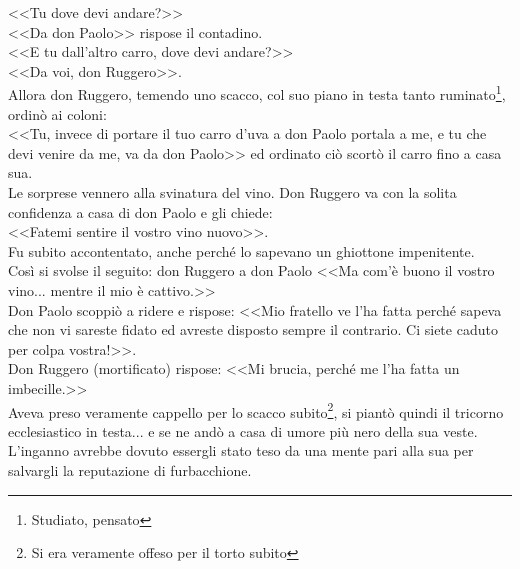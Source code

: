 \indent <<Tu dove devi andare?>>\\
\indent <<Da don Paolo>> rispose il contadino. \\
\indent <<E tu dall'altro carro, dove devi andare?>> \\
\indent <<Da voi, don Ruggero>>. \\
\indent Allora don Ruggero, temendo uno scacco, col suo piano in testa tanto ruminato\footnote{Studiato, pensato}, ordinò ai coloni: \\
\indent <<Tu, invece di portare il tuo carro d'uva a don Paolo portala a me, e tu che devi venire da me, va da don Paolo>> ed ordinato ciò scortò il carro fino a casa sua.\\
\indent Le sorprese vennero alla svinatura del vino. Don Ruggero va con la solita confidenza a casa di don Paolo e gli chiede: \\
\indent <<Fatemi sentire il vostro vino nuovo>>. \\
\indent Fu subito accontentato, anche perché lo sapevano un ghiottone impenitente.\\
\indent Così si svolse il seguito: don Ruggero a don Paolo <<Ma com'è buono il vostro vino... mentre il mio è cattivo.>> \\
\indent Don Paolo scoppiò a ridere e rispose: <<Mio fratello ve l'ha fatta perché sapeva che non vi sareste fidato ed avreste disposto sempre il contrario. Ci siete caduto per colpa vostra!>>.\\
\indent Don Ruggero (mortificato) rispose: <<Mi brucia, perché me l'ha fatta un imbecille.>>\\
\indent Aveva preso veramente cappello per lo scacco subito\footnote{Si era veramente offeso per il torto subito}, si piantò quindi il tricorno ecclesiastico in testa... e se ne andò a casa di umore più nero della sua veste.\\
\indent L'inganno avrebbe dovuto essergli stato teso da una mente pari alla sua per salvargli la reputazione di furbacchione.\\


